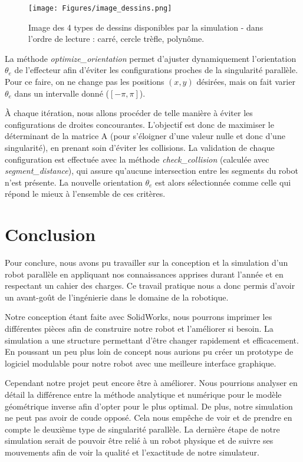 \documentclass[a4paper, 11pt]{report}
\begin{document}
\begin{figure}[!htb]
    \centering
    \texttt{[image: Figures/image\_dessins.png]}
    \caption{Image des 4 types de dessins disponibles par la simulation - dans l'ordre de lecture : carré, cercle trèfle, polynôme.}
    \label{fig:dessins}
\end{figure}

La méthode \textit{optimize\_orientation} permet d'ajuster dynamiquement l'orientation $\theta_e$ de l'effecteur afin d'éviter les configurations proches de la singularité parallèle. Pour ce faire, on ne change pas les positions $(x, y)$ désirées, mais on fait varier $\theta_e$ dans un intervalle donné ($[-\pi, \pi]$).

À chaque itération, nous allons procéder de telle manière à éviter les configurations de droites concourantes. L'objectif est donc de maximiser le déterminant de la matrice A (pour s'éloigner d'une valeur nulle et donc d'une singularité), en prenant soin d'éviter les collisions. La validation de chaque configuration est effectuée avec la méthode \textit{check\_collision} (calculée avec \textit{segment\_distance}), qui assure qu'aucune intersection entre les segments du robot n'est présente. La nouvelle orientation $\theta_e$ est alors sélectionnée comme celle qui répond le mieux à l'ensemble de ces critères.

\section*{Conclusion}
Pour conclure, nous avons pu travailler sur la conception et la simulation d'un robot parallèle en appliquant nos connaissances apprises durant l'année et en respectant un cahier des charges. Ce travail pratique nous a donc permis d'avoir un avant-goût de l'ingénierie dans le domaine de la robotique.

Notre conception étant faite avec SolidWorks, nous pourrons imprimer les différentes pièces afin de construire notre robot et l'améliorer si besoin. La simulation a une structure permettant d'être changer rapidement et efficacement. En poussant un peu plus loin de concept nous aurions pu créer un prototype de logiciel modulable pour notre robot avec une meilleure interface graphique. 

Cependant notre projet peut encore être à améliorer. Nous pourrions analyser en détail la différence entre la méthode analytique et numérique pour le modèle géométrique inverse afin d'opter pour le plus optimal. De plus, notre simulation ne peut pas avoir de coude opposé. Cela nous empêche de voir et de prendre en compte le deuxième type de singularité parallèle. La dernière étape de notre simulation serait de pouvoir être relié à un robot physique et de suivre ses mouvements afin de voir la qualité et l'exactitude de notre simulateur.
\newpage

\newpage
\nocite{*}
\printbibliography
\end{document}
